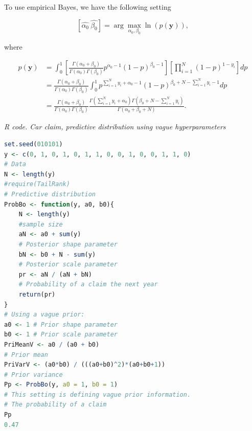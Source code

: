 \begin{enumerate}[leftmargin=*]
	To use empirical Bayes, we have the following setting
	
	\begin{equation*}
		\left[ \hat{\alpha_0} \ \hat{\beta_0}\right] = \arg \max_{\alpha_0, \beta_0} \ln (p(\textbf{y})), 
	\end{equation*}

where
	
	\begin{align}
		p(\textbf{y}) & = \int_{0}^{1} \left[ \frac{\Gamma\left( \alpha_0 + \beta_0\right) }{\Gamma\left( \alpha_0\right) \Gamma\left( \beta_0\right) } p^{\alpha_0 - 1} \left( 1 - p\right)^{\beta_0 - 1} \right]  \left[ \prod_{i = 1}^{N}  \left( 1 - p\right)^{1 - y_i}  \right] dp \\
		& =  \frac{\Gamma\left( \alpha_0 + \beta_0\right) }{\Gamma\left( \alpha_0\right) \Gamma\left( \beta_0\right) }  \int_{0}^{1} p^{\sum_{i = 1}^{N} y_i + \alpha_0 - 1} \left( 1 - p \right)^{\beta_0 + N - \sum_{i = 1}^{N} y_i -1} dp \nonumber \\
		& =  \frac{\Gamma\left( \alpha_0 + \beta_0\right) }{\Gamma\left( \alpha_0\right) \Gamma\left( \beta_0\right)} \frac{\Gamma\left(\sum_{i = 1}^{N} y_i + \alpha_0 \right) \Gamma\left(\beta_0 + N - \sum_{i = 1}^{N} y_i \right) }{\Gamma\left( \alpha_0 + \beta_0 + N\right) }.\nonumber 
	\end{align}

\begin{tcolorbox}[enhanced,width=4.67in,center upper,
	fontupper=\large\bfseries,drop shadow southwest,sharp corners]
	\textit{R code. Car claim, predictive distribution using vague hyperparameters}
\begin{VF}
\begin{lstlisting}[language=R]
set.seed(010101)
y <- c(0, 1, 0, 1, 0, 1, 1, 0, 0, 1, 0, 0, 1, 1, 0) 
# Data
N <- length(y)
#require(TailRank)
# Predictive distribution
ProbBo <- function(y, a0, b0){
	N <- length(y) 
	#sample size
	aN <- a0 + sum(y) 
	# Posterior shape parameter
	bN <- b0 + N - sum(y) 
	# Posterior scale parameter
	pr <- aN / (aN + bN) 
	# Probability of a claim the next year
	return(pr)
} 
# Using a vague prior:
a0 <- 1 # Prior shape parameter
b0 <- 1 # Prior scale parameter
PriMeanV <- a0 / (a0 + b0) 
# Prior mean
PriVarV <- (a0*b0) / (((a0+b0)^2)*(a0+b0+1)) 
# Prior variance
Pp <- ProbBo(y, a0 = 1, b0 = 1)
# This setting is defining vague prior information.
# The probability of a claim
Pp 
0.47
\end{lstlisting}
\end{VF}
\end{tcolorbox}



\end{enumerate}
